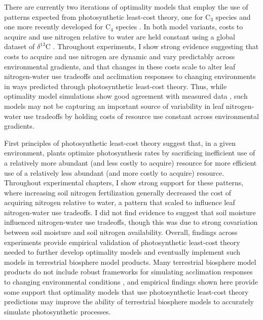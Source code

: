 There are currently two iterations of optimality models that employ the use of patterns expected from photosynthetic least-cost theory, one for C$_3$ species  and one more recently developed for C$_4$ species . In both model variants, costs to acquire and use nitrogen relative to water are held constant using a global dataset of $\delta^{13}$C . Throughout experiments, I show strong evidence suggesting that costs to acquire and use nitrogen are dynamic and vary predictably across environmental gradients, and that changes in these costs scale to alter leaf nitrogen-water use tradeoffs and acclimation responses to changing environments in ways predicted through photosynthetic least-cost theory. Thus, while optimality model simulations show good agreement with measured data , such models may not be capturing an important source of variability in leaf nitrogen-water use tradeoffs by holding costs of resource use constant across environmental gradients.

First principles of photosynthetic least-cost theory suggest that, in a given environment, plants optimize photosynthesis rates by sacrificing inefficient use of a relatively more abundant (and less costly to acquire) resource for more efficient use of a relatively less abundant (and more costly to acquire) resource. Throughout experimental chapters, I show strong support for these patterns, where increasing soil nitrogen fertilization generally decreased the cost of acquiring nitrogen relative to water, a pattern that scaled to influence leaf nitrogen-water use tradeoffs. I did not find evidence to suggest that soil moisture influenced nitrogen-water use tradeoffs, though this was due to strong covariation between soil moisture and soil nitrogen availability. Overall, findings across experiments provide empirical validation of photosynthetic least-cost theory needed to further develop optimality models and eventually implement such models in terrestrial biosphere model products. Many terrestrial biosphere model products do not include robust frameworks for simulating acclimation responses to changing environmental conditions , and empirical findings shown here provide some support that optimality models that use photosynthetic least-cost theory predictions may improve the ability of terrestrial biosphere models to accurately simulate photosynthetic processes.

